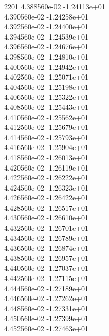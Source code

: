2201	4.388560e-02	-1.24113e+01	\\ 	4.390560e-02	-1.24258e+01	\\ 	4.392560e-02	-1.24400e+01	\\ 	4.394560e-02	-1.24539e+01	\\ 	4.396560e-02	-1.24676e+01	\\ 	4.398560e-02	-1.24810e+01	\\ 	4.400560e-02	-1.24942e+01	\\ 	4.402560e-02	-1.25071e+01	\\ 	4.404560e-02	-1.25198e+01	\\ 	4.406560e-02	-1.25322e+01	\\ 	4.408560e-02	-1.25443e+01	\\ 	4.410560e-02	-1.25562e+01	\\ 	4.412560e-02	-1.25679e+01	\\ 	4.414560e-02	-1.25793e+01	\\ 	4.416560e-02	-1.25904e+01	\\ 	4.418560e-02	-1.26013e+01	\\ 	4.420560e-02	-1.26119e+01	\\ 	4.422560e-02	-1.26222e+01	\\ 	4.424560e-02	-1.26323e+01	\\ 	4.426560e-02	-1.26422e+01	\\ 	4.428560e-02	-1.26517e+01	\\ 	4.430560e-02	-1.26610e+01	\\ 	4.432560e-02	-1.26701e+01	\\ 	4.434560e-02	-1.26789e+01	\\ 	4.436560e-02	-1.26874e+01	\\ 	4.438560e-02	-1.26957e+01	\\ 	4.440560e-02	-1.27037e+01	\\ 	4.442560e-02	-1.27115e+01	\\ 	4.444560e-02	-1.27189e+01	\\ 	4.446560e-02	-1.27262e+01	\\ 	4.448560e-02	-1.27331e+01	\\ 	4.450560e-02	-1.27399e+01	\\ 	4.452560e-02	-1.27463e+01	\\ \hline
